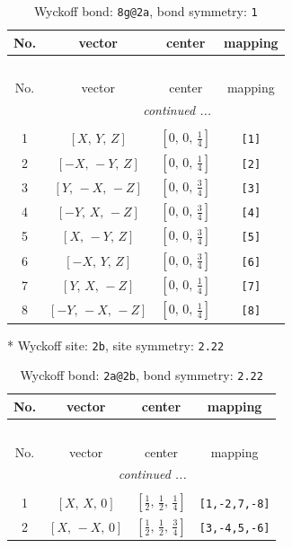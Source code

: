 \documentclass[fleqn,8pt]{jsarticle}
\begin{document}
\renewcommand{\arraystretch}{1.2}
\begin{longtable}{cccc}
\caption{Wyckoff bond: {\tt 8g@2a}, bond symmetry: {\tt 1}}
 \\
 \hline \hline
No. & vector & center & mapping \\ \hline \endfirsthead

\multicolumn{3}{l}{\tablename\ \thetable{}} \\
 \hline \hline
No. & vector & center & mapping \\ \hline \endhead

 \hline \hline
\multicolumn{3}{r}{\footnotesize\it continued ...} \\ \endfoot

 \hline \hline
\multicolumn{3}{r}{} \\ \endlastfoot

1 & $\left[ X,\, Y,\, Z \right]$ & $\left[ 0,\, 0,\, \frac{1}{4} \right]$ & {\tt [1]} \\ \hline
2 & $\left[ - X,\, - Y,\, Z \right]$ & $\left[ 0,\, 0,\, \frac{1}{4} \right]$ & {\tt [2]} \\ \hline
3 & $\left[ Y,\, - X,\, - Z \right]$ & $\left[ 0,\, 0,\, \frac{3}{4} \right]$ & {\tt [3]} \\ \hline
4 & $\left[ - Y,\, X,\, - Z \right]$ & $\left[ 0,\, 0,\, \frac{3}{4} \right]$ & {\tt [4]} \\ \hline
5 & $\left[ X,\, - Y,\, Z \right]$ & $\left[ 0,\, 0,\, \frac{3}{4} \right]$ & {\tt [5]} \\ \hline
6 & $\left[ - X,\, Y,\, Z \right]$ & $\left[ 0,\, 0,\, \frac{3}{4} \right]$ & {\tt [6]} \\ \hline
7 & $\left[ Y,\, X,\, - Z \right]$ & $\left[ 0,\, 0,\, \frac{1}{4} \right]$ & {\tt [7]} \\ \hline
8 & $\left[ - Y,\, - X,\, - Z \right]$ & $\left[ 0,\, 0,\, \frac{1}{4} \right]$ & {\tt [8]} \\
\end{longtable}
* Wyckoff site: {\tt 2b}, site symmetry: {\tt 2.22}
\renewcommand{\arraystretch}{1.2}
\begin{longtable}{cccc}
\caption{Wyckoff bond: {\tt 2a@2b}, bond symmetry: {\tt 2.22}}
 \\
 \hline \hline
No. & vector & center & mapping \\ \hline \endfirsthead

\multicolumn{3}{l}{\tablename\ \thetable{}} \\
 \hline \hline
No. & vector & center & mapping \\ \hline \endhead

 \hline \hline
\multicolumn{3}{r}{\footnotesize\it continued ...} \\ \endfoot

 \hline \hline
\multicolumn{3}{r}{} \\ \endlastfoot

1 & $\left[ X,\, X,\, 0 \right]$ & $\left[ \frac{1}{2},\, \frac{1}{2},\, \frac{1}{4} \right]$ & {\tt [1,-2,7,-8]} \\ \hline
2 & $\left[ X,\, - X,\, 0 \right]$ & $\left[ \frac{1}{2},\, \frac{1}{2},\, \frac{3}{4} \right]$ & {\tt [3,-4,5,-6]} \\
\end{longtable}
\end{document}
